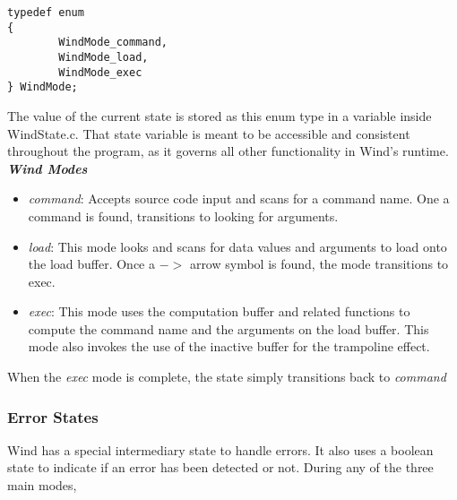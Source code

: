\begin{lstlisting}[style=customc]
typedef enum
{
        WindMode_command,
        WindMode_load,
        WindMode_exec
} WindMode;
\end{lstlisting} 

The value of the current state is stored as this enum type in a  variable inside WindState.c. That state variable is meant to be accessible and consistent throughout the program, as it governs all other functionality in Wind's runtime. \\

\textbf{\emph{Wind Modes}}
\begin{itemize}
\item \emph{command}: Accepts source code input and scans for a command name. One a command is found, transitions to looking for arguments.
\item \emph{load}: This mode looks and scans for data values and arguments to load onto the load buffer. Once a $->$ arrow symbol is found, the mode transitions to exec.
\item \emph{exec}: This mode uses the computation buffer and related functions to compute the command name and the arguments on the load buffer. This mode also invokes the use of the inactive buffer for the trampoline effect.
\end{itemize}

\par When the \emph{exec} mode is complete, the state simply transitions back to \emph{command}

\subsubsection{Error States}

Wind has a special intermediary state to handle errors. It also uses a  boolean state to indicate if an error has been detected or not. During any of the three main modes,